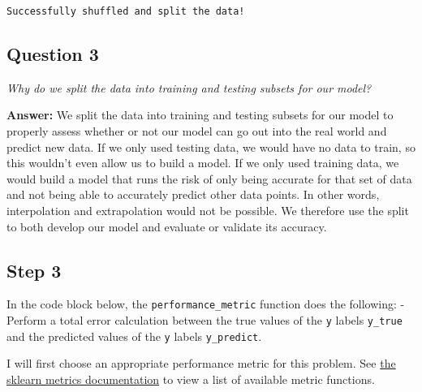 \documentclass{article}
\begin{document}
    \begin{Verbatim}[commandchars=\\\{\}]
Successfully shuffled and split the data!
    \end{Verbatim}

    \subsection{Question 3}\label{question-3}

\emph{Why do we split the data into training and testing subsets for our
model?}

    \textbf{Answer: } We split the data into training and testing subsets
for our model to properly assess whether or not our model can go out
into the real world and predict new data. If we only used testing data,
we would have no data to train, so this wouldn't even allow us to build
a model. If we only used training data, we would build a model that runs
the risk of only being accurate for that set of data and not being able
to accurately predict other data points. In other words, interpolation
and extrapolation would not be possible. We therefore use the split to
both develop our model and evaluate or validate its accuracy.

    \subsection{Step 3}\label{step-3}

In the code block below, the \texttt{performance\_metric} function does
the following: - Perform a total error calculation between the true
values of the \texttt{y} labels \texttt{y\_true} and the predicted
values of the \texttt{y} labels \texttt{y\_predict}.

I will first choose an appropriate performance metric for this problem.
See
\href{http://scikit-learn.org/stable/modules/classes.html\#sklearn-metrics-metrics}{the
sklearn metrics documentation} to view a list of available metric
functions.
\end{document}
